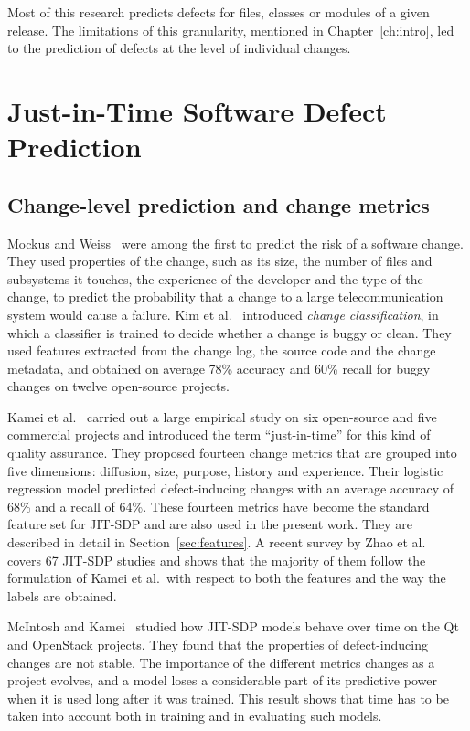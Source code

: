 \documentclass[12pt,a4paper,oneside]{report}
\begin{document}
Most of this research predicts defects for files, classes or modules of a
given release. The limitations of this granularity, mentioned in
Chapter~\ref{ch:intro}, led to the prediction of defects at the level of
individual changes.

\section{Just-in-Time Software Defect Prediction}

\subsection{Change-level prediction and change metrics}

Mockus and Weiss~\cite{mockus2000risk} were among the first to predict the
risk of a software change. They used properties of the change, such as its
size, the number of files and subsystems it touches, the experience of the
developer and the type of the change, to predict the probability that a change
to a large telecommunication system would cause a failure. Kim et
al.~\cite{kim2008classifying} introduced \emph{change classification}, in
which a classifier is trained to decide whether a change is buggy or clean.
They used features extracted from the change log, the source code and the
change metadata, and obtained on average 78\% accuracy and 60\% recall for
buggy changes on twelve open-source projects.

Kamei et al.~\cite{kamei2013jit} carried out a large empirical study on six
open-source and five commercial projects and introduced the term
``just-in-time'' for this kind of quality assurance. They proposed fourteen
change metrics that are grouped into five dimensions: diffusion, size,
purpose, history and experience. Their logistic regression model predicted
defect-inducing changes with an average accuracy of 68\% and a recall of 64\%.
These fourteen metrics have become the standard feature set for JIT-SDP and
are also used in the present work. They are described in detail in
Section~\ref{sec:features}. A recent survey by Zhao et
al.~\cite{zhao2023survey} covers 67 JIT-SDP studies and shows that the
majority of them follow the formulation of Kamei et al.\ with respect to both
the features and the way the labels are obtained.

McIntosh and Kamei~\cite{mcintosh2018moving} studied how JIT-SDP models
behave over time on the Qt and OpenStack projects. They found that the
properties of defect-inducing changes are not stable. The importance of the
different metrics changes as a project evolves, and a model loses a
considerable part of its predictive power when it is used long after it was
trained. This result shows that time has to be taken into account both in
training and in evaluating such models.
\end{document}
